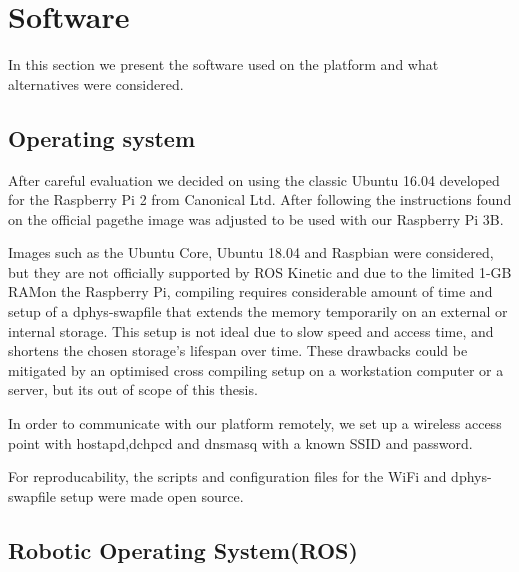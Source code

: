 \documentclass[class=article, crop=false]{standalone}
\begin{document}
\section{Software}\label{sec:software}
In this section we present the software used on the platform and what alternatives were considered.

\subsection{Operating system}\label{subsec:os}
After careful evaluation we decided on using the classic Ubuntu 16.04 developed for the Raspberry Pi 2 from Canonical Ltd. After following the instructions found on the official page\footnotemark the image was adjusted to be used with our Raspberry Pi 3B.


Images such as the Ubuntu Core, Ubuntu 18.04 and Raspbian were considered, but they are not officially supported by ROS Kinetic and due to the limited 1-GB RAM\footnotemark on the Raspberry Pi, compiling requires considerable amount of time and setup of a dphys-swapfile that extends the memory temporarily on an external or internal storage. This setup is not ideal due to slow speed and access time, and shortens the chosen storage's lifespan over time. These drawbacks could be mitigated by an optimised cross compiling setup on a workstation computer or a server, but its out of scope of this thesis.


In order to communicate with our platform remotely, we set up a wireless access point with hostapd,dchpcd and dnsmasq with a known SSID and password.

For reproducability, the scripts and configuration files for the WiFi and dphys-swapfile setup were made open source\footnotemark.


\subsection{Robotic Operating System(ROS)}\label{subsec:ros}

\end{document}
